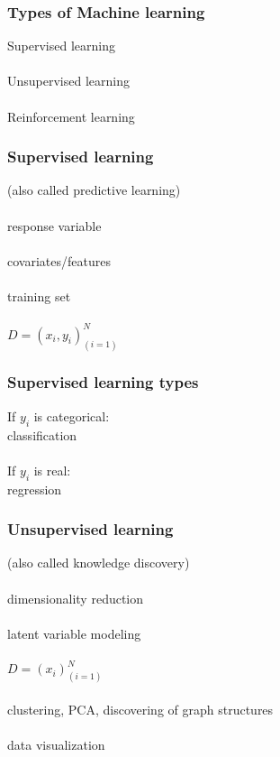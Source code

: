 \documentclass{beamer}
\begin{document}
\begin{frame}
	\frametitle{Types of Machine learning}
	\begin{center}
		Supervised learning\\~\\
		Unsupervised learning\\~\\
		Reinforcement learning
	\end{center}
\end{frame}

\begin{frame}
	\frametitle{Supervised learning}
	\begin{center}
		(also called predictive learning)\\~\\
		response variable\\~\\
		covariates/features\\~\\
		training set\\~\\
		$D = (x_i,y_i)_{(i=1)}^N$
	\end{center}
\end{frame}

\begin{frame}
	\frametitle{Supervised learning types}
	\begin{center}
		If $y_i$ is categorical:\\
		classification\\~\\
		If $y_i$ is real:\\
		regression
	\end{center}
\end{frame}

\begin{frame}
	\frametitle{Unsupervised learning}
	\begin{center}
		(also called knowledge discovery)\\~\\
		dimensionality reduction\\~\\
		latent variable modeling\\~\\
		$D = (x_i)_{(i=1)}^N$ \\~\\
		clustering, PCA, discovering of graph structures\\~\\
		data visualization\\~\\
	\end{center}
\end{frame}
\end{document}
